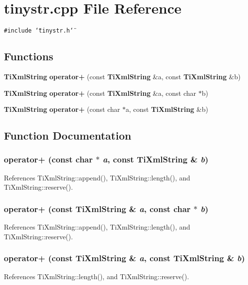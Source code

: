 \section{tinystr.cpp File Reference}
\label{tinystr_8cpp}


{\tt \#include \char`\"{}tinystr.h\char`\"{}}\par
\subsection*{Functions}
\begin{CompactItemize}
\item 
{\bf TiXmlString} {\bf operator+} (const {\bf TiXmlString} \&a, const {\bf TiXmlString} \&b)
\item 
{\bf TiXmlString} {\bf operator+} (const {\bf TiXmlString} \&a, const char $\ast$b)
\item 
{\bf TiXmlString} {\bf operator+} (const char $\ast$a, const {\bf TiXmlString} \&b)
\end{CompactItemize}


\subsection{Function Documentation}
\subsubsection[operator+]{ operator+ (const char $\ast$ {\em a}, \/  const {\bf TiXmlString} \& {\em b})}\label{tinystr_8cpp_c0f2988a051a761664d80de81462fc4d}




References TiXmlString::append(), TiXmlString::length(), and TiXmlString::reserve().
\subsubsection[operator+]{ operator+ (const {\bf TiXmlString} \& {\em a}, \/  const char $\ast$ {\em b})}\label{tinystr_8cpp_b77ef9617d62643b24e52118db159b7b}




References TiXmlString::append(), TiXmlString::length(), and TiXmlString::reserve().
\subsubsection[operator+]{ operator+ (const {\bf TiXmlString} \& {\em a}, \/  const {\bf TiXmlString} \& {\em b})}\label{tinystr_8cpp_6ee35bce93b3aaf8a2353471c0dd2d58}




References TiXmlString::length(), and TiXmlString::reserve().